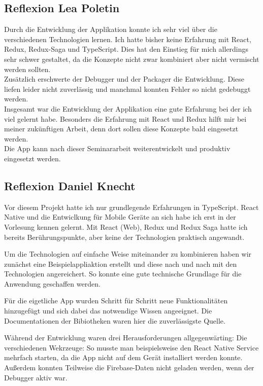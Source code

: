 \subsection{Reflexion Lea Poletin}
Durch die Entwicklung der Applikation konnte ich sehr viel über die verschiedenen Technologien lernen. 
Ich hatte bisher keine Erfahrung mit React, Redux, Redux-Saga und TypeScript. 
Dies hat den Einstieg für mich allerdings sehr schwer gestaltet, da die Konzepte nicht 
zwar kombiniert aber nicht vermischt werden sollten.\\
Zusätzlich erschwerte der Debugger und der Packager die Entwicklung. 
Diese liefen leider nicht zuverlässig und manchmal konnten Fehler so nicht 
gedebuggt werden. \\
Insgesamt war die Entwicklung der Applikation eine gute Erfahrung bei der ich viel gelernt habe. 
Besonders die Erfahrung mit React und Redux hilft mir bei meiner zukünftigen Arbeit, denn dort sollen
diese Konzepte bald eingesetzt werden.\\
Die App kann nach dieser Seminararbeit weiterentwickelt und produktiv eingesetzt werden. 


\subsection{Reflexion Daniel Knecht}
Vor diesem Projekt hatte ich nur grundlegende Erfahrungen in TypeScript.
React Native und die Entwiclkung für Mobile Geräte an sich habe ich erst in der Vorlesung kennen gelernt.
Mit React (Web), Redux und Redux Saga hatte ich bereits Berührungspunkte,
aber keine der Technologien praktisch angewandt.

Um die Technologien auf einfache Weise miteinander zu kombinieren haben wir zunächst eine
Beispielappliaktion erstellt und diese nach und nach mit den Technologien angereichert.
So konnte eine gute technische Grundlage für die Anwendung geschaffen werden.

Für die eigetliche App wurden Schritt für Schritt neue Funktionalitäten hinzugefügt
und sich dabei das notwendige Wissen angeeignet.
Die Documentationen der Bibiotheken waren hier die zuverlässigste Quelle.

Während der Entwicklung waren drei Herausforderungen allgegenwärting:
Die verschiedenen Wekrzeuge: So musste man beispielsweise den React Native Service mehrfach starten,
da die App nicht auf dem Gerät installiert werden konnte.
Außerdem konnten Teilweise die Firebase-Daten nicht geladen werden,
wenn der Debugger aktiv war.

